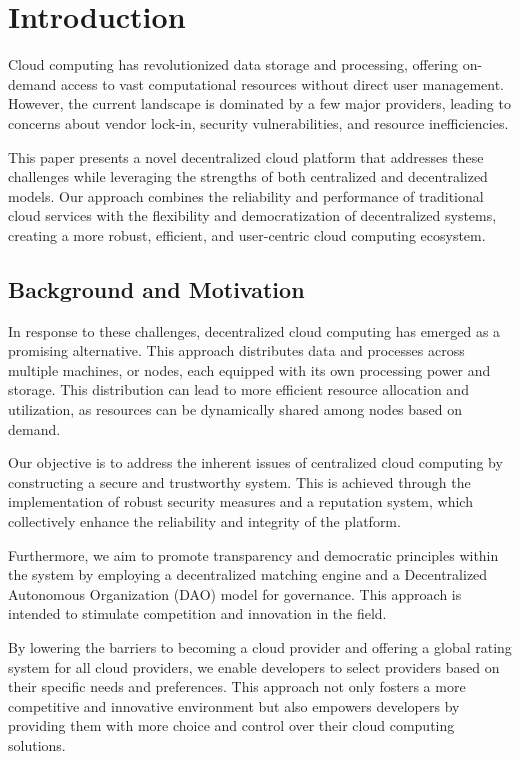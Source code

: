 \section{Introduction}
\label{sec:introduction}

Cloud computing has revolutionized data storage and processing, offering on-demand access to vast computational resources without direct user management. However, the current landscape is dominated by a few major providers, leading to concerns about vendor lock-in, security vulnerabilities, and resource inefficiencies.

This paper presents a novel decentralized cloud platform that addresses these challenges while leveraging the strengths of both centralized and decentralized models. Our approach combines the reliability and performance of traditional cloud services with the flexibility and democratization of decentralized systems, creating a more robust, efficient, and user-centric cloud computing ecosystem.
\subsection{Background and Motivation}
\label{sec:background}

In response to these challenges, decentralized cloud computing has emerged as a promising alternative. This approach distributes data and processes across multiple machines, or nodes, each equipped with its own processing power and storage. This distribution can lead to more efficient resource allocation and utilization, as resources can be dynamically shared among nodes based on demand.

Our objective is to address the inherent issues of centralized cloud computing by constructing a secure and trustworthy system. This is achieved through the implementation of robust security measures and a reputation system, which collectively enhance the reliability and integrity of the platform.

Furthermore, we aim to promote transparency and democratic principles within the system by employing a decentralized matching engine and a Decentralized Autonomous Organization (DAO) model for governance. This approach is intended to stimulate competition and innovation in the field.

By lowering the barriers to becoming a cloud provider and offering a global rating system for all cloud providers, we enable developers to select providers based on their specific needs and preferences. This approach not only fosters a more competitive and innovative environment but also empowers developers by providing them with more choice and control over their cloud computing solutions.


